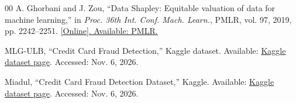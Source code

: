 \documentclass{ieeeaccess}
\begin{document}
\begin{thebibliography}{00}
A. Ghorbani and J. Zou, ``Data Shapley: Equitable valuation of data for
machine learning,'' in \emph{Proc. 36th Int. Conf. Mach. Learn.}, PMLR,
vol. 97, 2019, pp. 2242--2251.
\href{https://proceedings.mlr.press/v97/ghorbani19c.html}
{[Online]. Available: PMLR.}

MLG-ULB, ``Credit Card Fraud Detection,'' Kaggle dataset.
Available: \href{https://www.kaggle.com/datasets/mlg-ulb/creditcardfraud}
{Kaggle dataset page}.
Accessed: Nov. 6, 2026.

Miadul, ``Credit Card Fraud Detection Dataset,'' Kaggle.
Available: \href{https://www.kaggle.com/datasets/miadul/credit-card-fraud-detection-dataset/data}
{Kaggle dataset page}.
Accessed: Nov. 6, 2026.
\end{thebibliography}

\EOD
\end{document}
